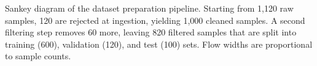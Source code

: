 \caption{Sankey diagram of the dataset preparation pipeline. Starting from 1{,}120 raw samples, 120 are rejected at ingestion, yielding 1{,}000 cleaned samples. A second filtering step removes 60 more, leaving 820 filtered samples that are split into training (600), validation (120), and test (100) sets. Flow widths are proportional to sample counts.}
